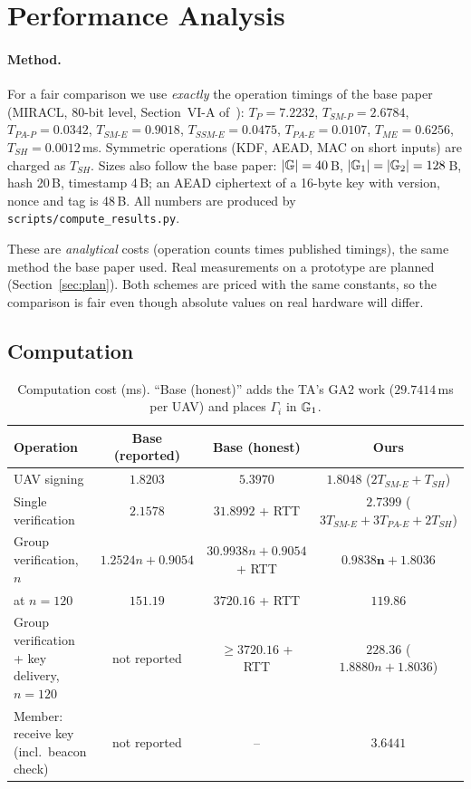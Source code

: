 \section{Performance Analysis}\label{sec:perf}
\paragraph{Method.} For a fair comparison we use \emph{exactly} the operation timings of the base paper (MIRACL, 80-bit level, Section~VI-A of~\cite{base}):
$T_P=7.2232$, $T_{SM\text{-}P}=2.6784$, $T_{PA\text{-}P}=0.0342$, $T_{SM\text{-}E}=0.9018$, $T_{SSM\text{-}E}=0.0475$, $T_{PA\text{-}E}=0.0107$,
$T_{ME}=0.6256$, $T_{SH}=0.0012$\,ms. Symmetric operations (KDF, AEAD, MAC on short inputs) are charged as $T_{SH}$. Sizes also follow the base paper:
$|\mathbb{G}|=40$\,B, $|\mathbb{G}_1|=|\mathbb{G}_2|=128$\,B, hash 20\,B, timestamp 4\,B; an AEAD ciphertext of a 16-byte key with version, nonce and tag is 48\,B. All numbers are produced by
\texttt{scripts/compute\_results.py}.
\begin{limitbox}
These are \emph{analytical} costs (operation counts times published timings), the same method the base paper used. Real measurements on a prototype are
planned (Section~\ref{sec:plan}). Both schemes are priced with the same constants, so the comparison is fair even though absolute values on real hardware will differ.
\end{limitbox}

\subsection{Computation}
\begin{table}[H]
\centering\small
\caption{Computation cost (ms). ``Base (honest)'' adds the TA's GA2 work ($29.7414$\,ms per UAV) and places $\Gamma_i$ in $\mathbb{G}_1$.}
\label{tab:comp}
\begin{tabularx}{\linewidth}{@{}>{\raggedright\arraybackslash}X ccc@{}}
\toprule
Operation & Base (reported) & Base (honest) & \textbf{Ours}\\
\midrule
UAV signing & $1.8203$ & $5.3970$ & $\mathbf{1.8048}$ \;($2T_{SM\text{-}E}+T_{SH}$)\\
Single verification & $2.1578$ & $31.8992$ + RTT & $\mathbf{2.7399}$ \;($3T_{SM\text{-}E}+3T_{PA\text{-}E}+2T_{SH}$)\\
Group verification, $n$ & $1.2524n+0.9054$ & $30.9938n+0.9054$ + RTT & $\mathbf{0.9838n+1.8036}$\\
\quad at $n=120$ & $151.19$ & $3720.16$ + RTT & $\mathbf{119.86}$\\
Group verification + key delivery, $n=120$ & not reported & $\ge 3720.16$ + RTT & $\mathbf{228.36}$ \;($1.8880n+1.8036$)\\
Member: receive key (incl.\ beacon check) & not reported & -- & $3.6441$\\
\bottomrule
\end{tabularx}
\end{table}

